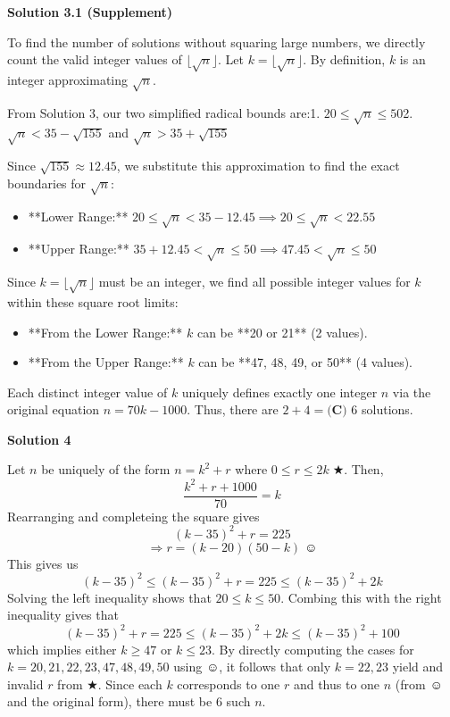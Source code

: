 \begin{enumerate}
 



\textbf{Solution 3.1 (Supplement)}

To find the number of solutions without squaring large numbers, we directly count the valid integer values of $\lfloor \sqrt{n} \rfloor$. Let $k = \lfloor \sqrt{n} \rfloor$. By definition, $k$ is an integer approximating $\sqrt{n}$.

 From Solution 3, our two simplified radical bounds are:1. $20 \leq \sqrt{n} \leq 50$2. $\sqrt{n} < 35 - \sqrt{155}$ and $\sqrt{n} > 35 + \sqrt{155}$

 Since $\sqrt{155} \approx 12.45$, we substitute this approximation to find the exact boundaries for $\sqrt{n}$:

 
            \begin{itemize}
        \item **Lower Range:** $20 \leq \sqrt{n} < 35 - 12.45 \implies 20 \leq \sqrt{n} < 22.55$
        \item **Upper Range:** $35 + 12.45 < \sqrt{n} \leq 50 \implies 47.45 < \sqrt{n} \leq 50$
            \end{itemize}
            Since $k = \lfloor \sqrt{n} \rfloor$ must be an integer, we find all possible integer values for $k$ within these square root limits:

 
            \begin{itemize}
        \item **From the Lower Range:** $k$ can be **20 or 21** (2 values).
        \item **From the Upper Range:** $k$ can be **47, 48, 49, or 50** (4 values).
            \end{itemize}
            Each distinct integer value of $k$ uniquely defines exactly one integer $n$ via the original equation $n = 70k - 1000$. Thus, there are $2 + 4 = \boxed{\textbf{(C) } 6}$ solutions.

 



\textbf{Solution 4}

Let $n$ be uniquely of the form $n=k^2+r$ where $0 \le r \le 2k \; \bigstar$. Then, 
 \[\frac{k^2+r+1000}{70} = k\] Rearranging and completeing the square gives 
 \[(k-35)^2 + r = 225\] 
 \[\Rightarrow r = (k-20)(50-k)\; \smiley\] This gives us 
 \[(k-35)^2 \le (k-35)^2+r=225 \le (k-35)^2 + 2k\] Solving the left inequality shows that $20 \le k \le 50$. Combing this with the right inequality gives that 
 \[(k-35)^2+r=225 \le (k-35)^2 + 2k \le (k-35)^2+100\] which implies either $k \ge 47$ or $k \le 23$. By directly computing the cases for $k = 20, 21, 22, 23, 47, 48, 49, 50$ using $\smiley$, it follows that only $k = 22, 23$ yield and invalid $r$ from $\bigstar$. Since each $k$ corresponds to one $r$ and thus to one $n$ (from $\smiley$ and the original form), there must be 6 such $n$.  


\end{enumerate}
